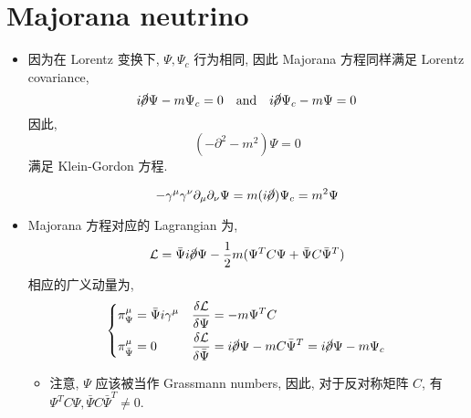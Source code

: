 \section{Majorana neutrino}
\begin{itemize}
	\item 因为在 Lorentz 变换下, $\Psi, \Psi_c$ 行为相同, 因此 Majorana 方程同样满足 Lorentz covariance,
	\begin{equation}
		i \cancel{\partial} \Psi - m \Psi_c = 0 \quad \text{and} \quad i \cancel{\partial} \Psi_c - m \Psi = 0
	\end{equation}
	因此,
	\begin{equation}
		(- \partial^2 - m^2) \Psi = 0
	\end{equation}
	满足 Klein-Gordon 方程.
	
	\begin{tcolorbox}[title=calculation:]
		\begin{equation}
			- \gamma^\mu \gamma^\nu \partial_\mu \partial_\nu \Psi = m (i \cancel{\partial}) \Psi_c = m^2 \Psi
		\end{equation}
	\end{tcolorbox}
	
	\item Majorana 方程对应的 Lagrangian 为,
	\begin{equation}
		\mathcal{L} = \bar{\Psi} i \cancel{\partial} \Psi - \frac{1}{2} m (\Psi^T C \Psi + \bar{\Psi} C \bar{\Psi}^T)
	\end{equation}
	相应的广义动量为,
	\begin{equation}
		\begin{dcases}
			\pi_\Psi^\mu = \bar{\Psi} i \gamma^\mu & \frac{\delta \mathcal{L}}{\delta \Psi} = - m \Psi^T C \\
			\pi_{\bar{\Psi}}^\mu = 0 & \frac{\delta \mathcal{L}}{\delta \bar{\Psi}} = i \cancel{\partial} \Psi - m C \bar{\Psi}^T = i \cancel{\partial} \Psi - m \Psi_c
		\end{dcases}
	\end{equation}
	\begin{itemize}
		\item 注意, $\Psi$ 应该被当作 Grassmann numbers, 因此, 对于反对称矩阵 $C$, 有 $\Psi^T C \Psi, \bar{\Psi} C \bar{\Psi}^T \neq 0$.
	\end{itemize}
	

\end{itemize}
